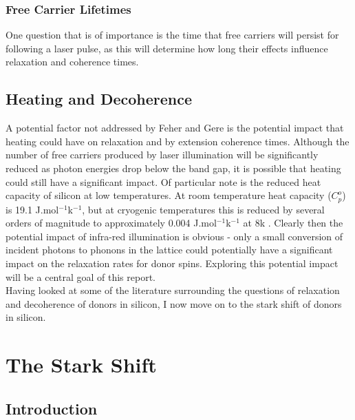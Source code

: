 \subsubsection{Free Carrier Lifetimes}

One question that is of importance is the time that free carriers will persist for following a laser pulse, as this will determine how long their effects influence relaxation and coherence times.

\subsection{Heating and Decoherence}

A potential factor not addressed by Feher and Gere is the potential impact that heating could have on relaxation and by extension coherence times. 
Although the number of free carriers produced by laser illumination will be significantly reduced as photon energies drop below the band gap, it is possible that heating could still have a significant impact.
Of particular note is the reduced heat capacity of silicon at low temperatures. 
At room temperature heat capacity ($C_p^o$) is 19.1 J.mol$^{-1}$k$^{-1}$, but at cryogenic temperatures this is reduced by several orders of magnitude to approximately 0.004 J.mol$^{-1}$k$^{-1}$ at 8k \cite{Desai1986,Niinikoski1986}.
Clearly then the potential impact of infra-red illumination is obvious - only a small conversion of incident photons to phonons in the lattice could potentially have a significant impact on the relaxation rates for donor spins.
Exploring this potential impact will be a central goal of this report.
\\
Having looked at some of the literature surrounding the questions of relaxation and decoherence of donors in silicon, I now move on to the stark shift of donors in silicon.

\section{The Stark Shift}
\label{sec:starkShiftLit}

\subsection{Introduction}

